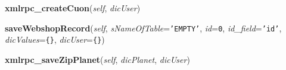     \vspace{0.5ex}

\hspace{.8\funcindent}\begin{boxedminipage}{\funcwidth}

    \raggedright \textbf{xmlrpc\_createCuon}(\textit{self}, \textit{dicUser})

\setlength{\parskip}{2ex}
\setlength{\parskip}{1ex}
    \end{boxedminipage}

    \label{cuon:Database:Database:saveWebshopRecord}

    \vspace{0.5ex}

\hspace{.8\funcindent}\begin{boxedminipage}{\funcwidth}

    \raggedright \textbf{saveWebshopRecord}(\textit{self}, \textit{sNameOfTable}={\tt \texttt{'}\texttt{EMPTY}\texttt{'}}, \textit{id}={\tt 0}, \textit{id\_field}={\tt \texttt{'}\texttt{id}\texttt{'}}, \textit{dicValues}={\tt \texttt{\{}\texttt{\}}}, \textit{dicUser}={\tt \texttt{\{}\texttt{\}}})

\setlength{\parskip}{2ex}
\setlength{\parskip}{1ex}
    \end{boxedminipage}

    \label{cuon:Database:Database:xmlrpc_saveZipPlanet}

    \vspace{0.5ex}

\hspace{.8\funcindent}\begin{boxedminipage}{\funcwidth}

    \raggedright \textbf{xmlrpc\_saveZipPlanet}(\textit{self}, \textit{dicPlanet}, \textit{dicUser})

\setlength{\parskip}{2ex}
\setlength{\parskip}{1ex}
    \end{boxedminipage}

    \label{cuon:Database:Database:xmlrpc_saveZipCountry}

